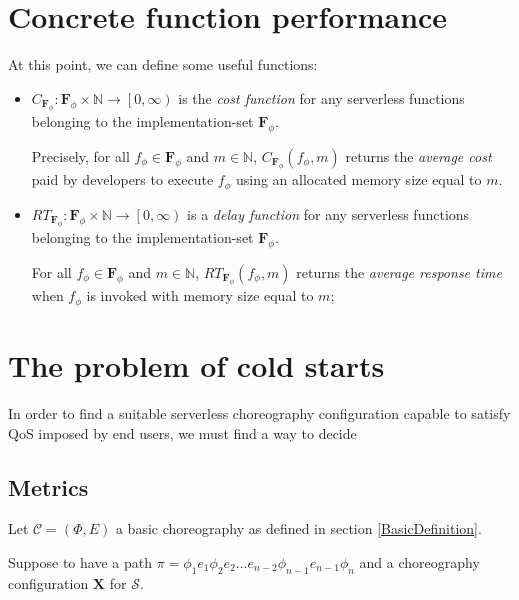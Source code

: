\documentclass[12pt,a4paper]{report}
\newcommand*{\N}{\mathbb{N}}
\theoremstyle{definition}
\begin{document}
\section{Concrete function performance}

At this point, we can define some useful functions:

\begin{itemize}	
	\item $C_{\textbf{F}_{\phi}} : \textbf{F}_{\phi} \times \N \to \left[ 0, \infty \right)$ is the \textit{cost function} for any serverless functions belonging to the implementation-set $\textbf{F}_{\phi}$.
	
	Precisely, for all $f_{\phi} \in \textbf{F}_{\phi}$ and $m \in \N$, $C_{\textbf{F}_{\phi}}(f_{\phi}, m)$ returns the \textit{average cost} paid by developers to execute $f_{\phi}$ using an allocated memory size equal to $m$.
	
	
	\item $RT_{\textbf{F}_{\phi}} : \textbf{F}_{\phi} \times \N \to \left[ 0, \infty \right)$ is a \textit{delay function} for any serverless functions belonging to the implementation-set $\textbf{F}_{\phi}$.
	
	For all $f_{\phi} \in \textbf{F}_{\phi}$ and $m \in \N$, $RT_{\textbf{F}_{\phi}}(f_{\phi}, m)$ returns the \textit{average response time} when $f_{\phi}$ is invoked with memory size equal to $m$;
\end{itemize}






\section{The problem of cold starts}

In order to find a suitable serverless choreography configuration capable to satisfy QoS imposed by end users, we must find a way to decide  





\subsection{Metrics}

Let $\mathcal{C} = (\Phi,E)$ a basic choreography as defined in section \ref{BasicDefinition}.



Suppose to have a path $\pi = \phi_1 e_1 \phi_2 e_2 \ldots e_{n-2}\phi_{n-1} e_{n-1} \phi_n$ and a choreography configuration $\textbf{X}$ for $\mathcal{S}$. 
\end{document}
